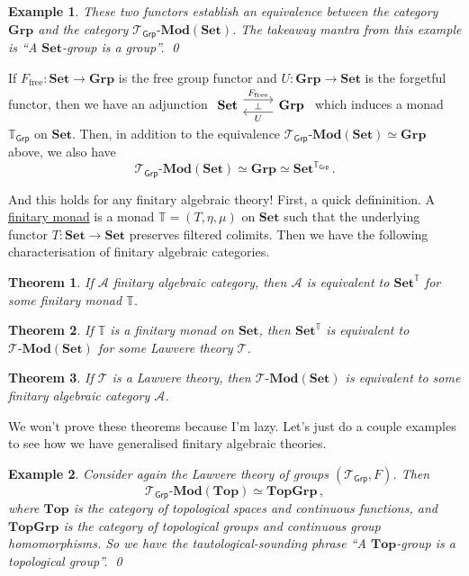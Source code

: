 \documentclass[a4paper,11pt]{article}
\theoremstyle{break_italics}
\newtheorem*{theorem*}{Theorem}
\theoremstyle{break_upright}
\newtheorem*{example*}{Example}
\theoremstyle{remark}
\newcommand{\Set}{\mathbf{Set}}
\begin{document}
\begin{example*}
	These two functors establish an equivalence between the category $\mathbf{Grp}$ and the category $\mathcal T_{\mathsf{Grp}}\text{-}\mathbf{Mod}(\Set)$. The takeaway mantra from this example is ``A $\Set$-group is a group''. \qed
\end{example*}

If $F_{\text{free}} \colon \Set \to \mathbf{Grp}$ is the free group functor and $U \colon \mathbf{Grp} \to \Set$ is the forgetful functor, then we have an adjunction $\begin{tikzcd}
	\Set & \mathbf{Grp}
	\arrow["\bot"{description}, draw=none, from=1-1, to=1-2]
	\arrow["{F_{\text{free}}}", shift left=2, from=1-1, to=1-2]
	\arrow["U", shift left=2, from=1-2, to=1-1]
\end{tikzcd}$ which induces a monad $\mathbb T_{\mathsf{Grp}}$ on $\Set$. Then, in addition to the equivalence $\mathcal T_{\mathsf{Grp}}\text{-}\mathbf{Mod}(\Set) \simeq \mathbf{Grp}$ above, we also have
\[
	\mathcal T_{\mathsf{Grp}}\text{-}\mathbf{Mod}(\Set) \simeq \mathbf{Grp} \simeq \Set^{\mathbb T_{\mathsf{Grp}}}\,.
\]

And this holds for any finitary algebraic theory! First, a quick defininition. A \uline{finitary monad} is a monad $\mathbb T = (T,\eta,\mu)$ on $\Set$ such that the underlying functor $T \colon \Set \to \Set$ preserves filtered colimits. Then we have the following characterisation of finitary algebraic categories.

\begin{theorem*}
	If $\mathcal A$ finitary algebraic category, then $\mathcal A$ is equivalent to $\Set^{\mathbb T}$ for some finitary monad $\mathbb T$.
\end{theorem*}


\begin{theorem*}
	If $\mathbb T$ is a finitary monad on $\Set$, then $\Set^{\mathbb T}$ is equivalent to $\mathcal T\text{-}\mathbf{Mod}(\Set)$ for some Lawvere theory $\mathcal T$.
\end{theorem*}


\begin{theorem*}
	If $\mathcal T$ is a Lawvere theory, then $\mathcal T\text{-}\mathbf{Mod}(\Set)$ is equivalent to some finitary algebraic category $\mathcal A$.
\end{theorem*}

We won't prove these theorems because I'm lazy. Let's just do a couple examples to see how we have generalised finitary algebraic theories.

\begin{example*}
	Consider again the Lawvere theory of groups $(\mathcal T_{\mathsf{Grp}}, F)$. Then
	\[
		\mathcal T_{\mathsf{Grp}}\text{-}\mathbf{Mod}(\mathbf{Top}) \simeq \mathbf{TopGrp}\,,
	\]
	where $\mathbf{Top}$ is the category of topological spaces and continuous functions, and $\mathbf{TopGrp}$ is the category of topological groups and continuous group homomorphisms. So we have the tautological-sounding phrase ``A $\mathbf{Top}$-group is a topological group''. \qed
\end{example*}
\end{document}

